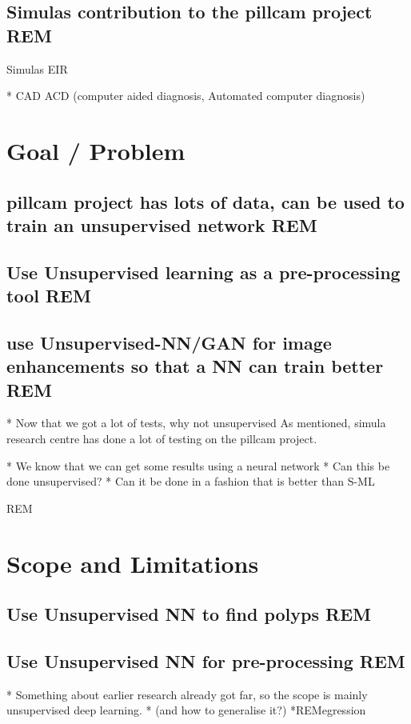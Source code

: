 	
	\vspace{10px}
	\subsection{Simulas contribution to the pillcam project REM}
	Simulas EIR
		

		
	* CAD ACD (computer aided diagnosis, Automated computer diagnosis)
	
	\section{Goal / Problem}
		\subsection{pillcam project has lots of data, can be used to train an unsupervised network REM}
		\subsection{Use Unsupervised learning as a pre-processing tool REM}
		\subsection{use Unsupervised-NN/GAN for image enhancements so that a NN can train better REM}
		* Now that we got a lot of tests, why not unsupervised
		As mentioned, simula research centre has done a lot of testing on the pillcam project.
		  
		* We know that we can get some results using a neural network
		* Can this be done unsupervised?
		* Can it be done in a fashion that is better than S-ML
		 
		 REM

		
	\section{Scope and Limitations}
		\subsection{Use Unsupervised NN to find polyps REM}
		\subsection{Use Unsupervised NN for pre-processing REM}
		* Something about earlier research already got far, so the scope is mainly unsupervised deep learning.
		* (and how to generalise it?)
*REMegression	
		

